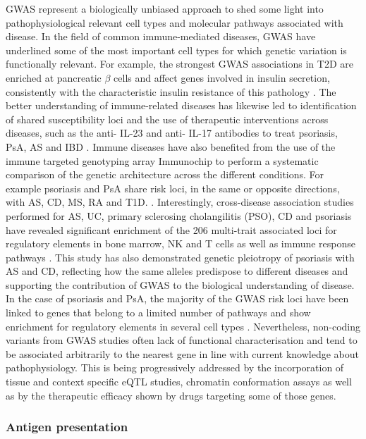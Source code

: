 GWAS represent a biologically unbiased approach to shed some light into pathophysiological relevant cell types and molecular pathways associated with disease. In the field of common immune-mediated diseases, GWAS have underlined some of the most important cell types for which genetic variation is functionally relevant. For example, the strongest GWAS associations in T2D are enriched at pancreatic $\beta$ cells and affect genes involved in insulin secretion, consistently with the characteristic insulin resistance of this pathology \parencite{Visscher2017}. The better understanding of immune-related diseases has likewise led to identification of shared susceptibility loci and the use of therapeutic interventions across diseases, such as the anti- IL-23 and anti- IL-17 antibodies to treat psoriasis, PsA, AS and IBD \parencite{Visscher2017}.
Immune diseases have also benefited from the use of the immune targeted genotyping array Immunochip to perform a systematic comparison of the genetic architecture across the different conditions. For example psoriasis and PsA share risk loci, in the same or opposite directions, with AS, CD, MS, RA and T1D. \parencite{ImmunoBase}. Interestingly, cross-disease association studies performed for AS, UC, primary sclerosing cholangilitis (PSO), CD and psoriasis  have revealed significant enrichment of the 206 multi-trait associated loci for regulatory elements in bone marrow, NK and T cells as well as immune response pathways \parencite{Ellinghaus2016}. This study has also demonstrated genetic pleiotropy of psoriasis with AS and CD, reflecting how the same alleles predispose to different diseases and supporting the contribution of GWAS to the biological understanding of disease.
In the case of psoriasis and PsA, the majority of the GWAS risk loci have been linked to genes that belong to a limited number of pathways and show enrichment for regulatory elements in several cell types \parencite{Capon2017}. Nevertheless, non-coding variants from GWAS studies often lack of functional characterisation and tend to be associated arbitrarily to the nearest gene in line with current knowledge about pathophysiology. This is being progressively addressed by the incorporation of tissue and context specific eQTL studies, chromatin conformation assays as well as by the therapeutic efficacy shown by drugs targeting some of those genes.


\subsubsection*{Antigen presentation}

